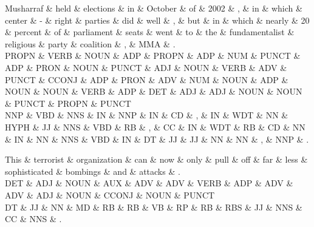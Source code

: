 \begin{dependency}
\begin{deptext}
Musharraf \& held \& elections \& in \& October \& of \& 2002 \& , \& in \& which \& center \& - \& right \& parties \& did \& well \& , \& but \& in \& which \& nearly \& 20 \& percent \& of \& parliament \& seats \& went \& to \& the \& fundamentalist \& religious \& party \& coalition \& , \& MMA \& . \\
PROPN \& VERB \& NOUN \& ADP \& PROPN \& ADP \& NUM \& PUNCT \& ADP \& PRON \& NOUN \& PUNCT \& ADJ \& NOUN \& VERB \& ADV \& PUNCT \& CCONJ \& ADP \& PRON \& ADV \& NUM \& NOUN \& ADP \& NOUN \& NOUN \& VERB \& ADP \& DET \& ADJ \& ADJ \& NOUN \& NOUN \& PUNCT \& PROPN \& PUNCT \\
NNP \& VBD \& NNS \& IN \& NNP \& IN \& CD \& , \& IN \& WDT \& NN \& HYPH \& JJ \& NNS \& VBD \& RB \& , \& CC \& IN \& WDT \& RB \& CD \& NN \& IN \& NN \& NNS \& VBD \& IN \& DT \& JJ \& JJ \& NN \& NN \& , \& NNP \& . \\
\end{deptext}



\end{dependency}

\begin{dependency}
\begin{deptext}
This \& terrorist \& organization \& can \& now \& only \& pull \& off \& far \& less \& sophisticated \& bombings \& and \& attacks \& . \\
DET \& ADJ \& NOUN \& AUX \& ADV \& ADV \& VERB \& ADP \& ADV \& ADV \& ADJ \& NOUN \& CCONJ \& NOUN \& PUNCT \\
DT \& JJ \& NN \& MD \& RB \& RB \& VB \& RP \& RB \& RBS \& JJ \& NNS \& CC \& NNS \& . \\
\end{deptext}



\end{dependency}

